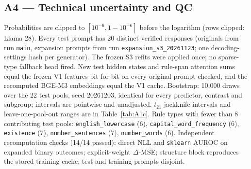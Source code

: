 \documentclass{article}
\begin{document}
\subsection*{A4 --- Technical uncertainty and QC}
Probabilities are clipped to $[10^{-6}, 1-10^{-6}]$ before the logarithm (rows clipped: Llama 28). Every test prompt has 20 distinct verified responses (originals from run \texttt{main}, expansion prompts from run \texttt{expansion\_s3\_20261123}; one decoding-settings hash per generator). The frozen S3 refits were applied once; no sparse-type fallback head fired. New test hidden states and rule-span attention sums equal the frozen V1 features bit for bit on every original prompt checked, and the recomputed BGE-M3 embeddings equal the V1 cache. Bootstrap: 10,000 draws over the 22 test pools, seed 20261203, identical for every predictor, contrast and subgroup; intervals are pointwise and unadjusted. $t_{21}$ jackknife intervals and leave-one-pool-out ranges are in Table~\ref{tab:A1c}. Rule types with fewer than 8 contributing test pools: \texttt{english\_lowercase} (6), \texttt{capital\_word\_frequency} (6), \texttt{existence} (7), \texttt{number\_sentences} (7), \texttt{number\_words} (6). Independent recomputation checks (14/14 passed): direct NLL and \texttt{sklearn} AUROC on expanded binary outcomes; explicit-weight $\Delta$-MSE; structure block reproduces the stored training cache; test and training prompts disjoint.
\end{document}
